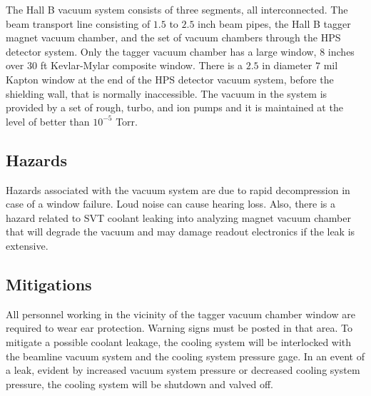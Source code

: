 
\indent

The Hall B vacuum system consists of three segments, all interconnected. The beam transport line consisting of $1.5$ to $2.5$ inch beam pipes, the Hall B tagger magnet vacuum chamber, and the set of vacuum chambers through the HPS detector system. Only the tagger vacuum chamber has a large window, $8$ inches over $30$ ft Kevlar-Mylar composite window. There is a $2.5$ in diameter $7$ mil Kapton window at the end of the HPS detector vacuum system, before the shielding wall, that is normally inaccessible. The vacuum in the system is provided by a set of rough, turbo, and ion pumps and it is maintained at the level of better than $10^{-5}$ Torr. 

\subsection{Hazards} 

\indent

Hazards associated with the vacuum system are due to rapid decompression in case of a window failure. Loud noise can cause hearing loss. Also, there is a hazard related to SVT coolant leaking into analyzing magnet vacuum chamber that will degrade the vacuum and may damage readout electronics if the leak is extensive.

\subsection{Mitigations}

\indent

All personnel working in the vicinity of the tagger vacuum chamber window are required to wear ear protection. Warning signs must be posted in that area. To mitigate a possible coolant leakage, the cooling system will be interlocked with the beamline vacuum system and the cooling system pressure gage. In an event of a leak, evident by increased vacuum system pressure or decreased cooling system pressure, the cooling system will be shutdown and valved off. 



